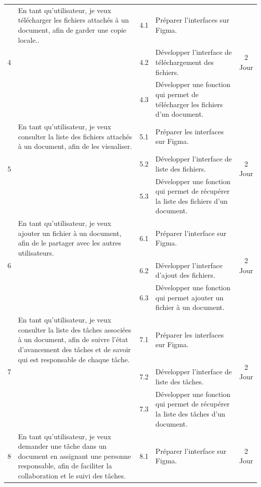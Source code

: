 \begin{adjustwidth}{-1cm}{}
\begin{longtable}{|c|p{6cm}|c|p{6cm}|c|}
      \cline{1-5}
      \multirow{3}{*}{4} & En tant qu'utilisateur, je veux télécharger les fichiers attachés à un document, afin de garder une copie locale.. & 4.1 & Préparer l'interfaces sur Figma. & \multirow{3}{*}{2 Jour} \\
      \cline{3-4}
      & & 4.2 & Développer l'interface de téléchargement des fichiers. & \\
      \cline{3-4}
      & & 4.3 & Développer une fonction qui permet de télécharger les fichiers d'un document. & \\
      \cline{1-5}
      \multirow{3}{*}{5} & En tant qu’utilisateur, je veux consulter la liste des fichiers attachés à un document, afin de les visualiser. & 5.1 & Préparer les interfaces sur Figma. & \multirow{3}{*}{2 Jour} \\
      \cline{3-4}
      & & 5.2 & Développer l'interface de liste des fichiers. & \\
      \cline{3-4}
      & & 5.3 & Développer une fonction qui permet de récupérer la liste des fichiers d'un document. & \\
      \cline{1-5}
      \multirow{3}{*}{6} & En tant qu'utilisateur, je veux ajouter un fichier à un document, afin de le partager avec les autres utilisateurs. & 6.1 & Préparer l'interface sur Figma. & \multirow{3}{*}{2 Jour} \\
      \cline{3-4}
      & & 6.2 & Développer l'interface d'ajout des fichiers. & \\
      \cline{3-4}
      & & 6.3 & Développer une fonction qui permet ajouter un fichier à un document. & \\
      \cline{1-5}
      \multirow{3}{*}{7} & En tant qu'utilisateur, je veux consulter la liste des tâches associées à un document, afin de suivre l'état d'avancement des tâches et de savoir qui est responsable de chaque tâche. & 7.1 & Préparer les interfaces sur Figma. & \multirow{3}{*}{2 Jour} \\
      \cline{3-4}
      & & 7.2 & Développer l'interface de liste des tâches. & \\
      \cline{3-4}
      & & 7.3 & Développer une fonction qui permet de récupérer la liste des tâches d'un document. & \\
      \cline{1-5}
      \multirow{3}{*}{8} & En tant qu'utilisateur, je veux demander une tâche dans un document en assignant une personne responsable, afin de faciliter la collaboration et le suivi des tâches. & 8.1 & Préparer l'interface sur Figma. & \multirow{3}{*}{2 Jour} \\

\end{longtable}
\end{adjustwidth}
